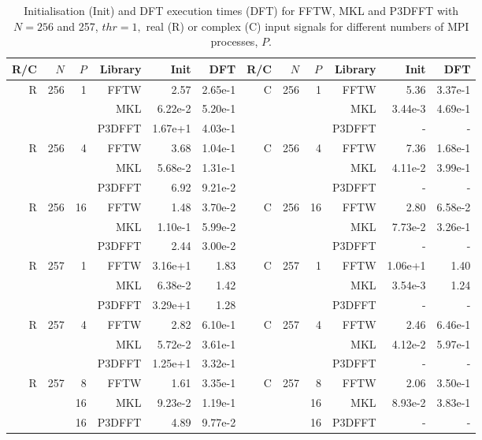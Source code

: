 \documentclass[a4paper]{article}
\begin{document}
\begin{table}[!htbp]
\begin{center}
\begin{tabular}{|r|r|r|r|r|r||r|r|r|r|r|r|}\hline
R/C & $N$ & $P$ & Library & Init & DFT & R/C & $N$ & $P$ & Library & Init & DFT\\ \hline
 R & 256 & 1 & FFTW &   2.57   &  2.65e-1  & C & 256 & 1 & FFTW &  5.36   &  3.37e-1  \\
  &  &  & MKL &   6.22e-2   &   5.20e-1  &   &  &  & MKL &   3.44e-3   &  4.69e-1   \\
  &  &  & P3DFFT &  1.67e+1   &   4.03e-1  &   &  &  & P3DFFT &  -   &  -  \\ \hline
 R & 256 & 4 & FFTW &   3.68    &   1.04e-1  &  C & 256 & 4 & FFTW &   7.36   &  1.68e-1  \\
  &  &  & MKL &  5.68e-2   &   1.31e-1  &  &  &  & MKL &   4.11e-2   &   3.99e-1  \\
  &  &  & P3DFFT &  6.92   &   9.21e-2 &  &  &  & P3DFFT &  -   &  -  \\ \hline
 R & 256 & 16 & FFTW &  1.48   &  3.70e-2  & C & 256 & 16 & FFTW &  2.80   &  6.58e-2  \\
  &  &  & MKL &   1.10e-1   &    5.99e-2 &  &  &  & MKL &   7.73e-2   &   3.26e-1  \\
  &  &  & P3DFFT &  2.44   &  3.00e-2  &  &  &  & P3DFFT &  -   &  -  \\ \hline\hline
 R & 257 & 1 & FFTW &  3.16e+1   &  1.83  & C & 257 & 1 & FFTW &   1.06e+1   &  1.40   \\
  &  &  & MKL &   6.38e-2   &   1.42  &  &  &  & MKL &   3.54e-3   &   1.24  \\
  &  &  & P3DFFT & 3.29e+1    &   1.28  &  &  &  & P3DFFT &  -   & -   \\ \hline
 R & 257 & 4 & FFTW &   2.82    &   6.10e-1  & C & 257 & 4 & FFTW &  2.46   &  6.46e-1  \\
  &  &  & MKL &   5.72e-2   &   3.61e-1  &  &  &  & MKL &  4.12e-2    &   5.97e-1  \\
  &  &  & P3DFFT &   1.25e+1   &  3.32e-1 &  &  &  & P3DFFT &  -   &  -  \\ \hline
 R & 257 & 8 & FFTW &  1.61   &  3.35e-1  & C & 257 & 8 & FFTW &  2.06   &   3.50e-1  \\
  &  & 16 & MKL &    9.23e-2  &  1.19e-1  &  &  & 16 & MKL &   8.93e-2   &  3.83e-1   \\
  &  & 16 & P3DFFT &   4.89   &   9.77e-2  &  &  & 16 & P3DFFT &  -   &  -  \\ \hline\hline
\end{tabular}
\caption{ Initialisation (Init) and DFT execution times (DFT) for FFTW, MKL and P3DFFT with $N=256$ and 257, $thr=1,$ real (R) or complex (C) input signals for different numbers of MPI processes, $P.$ }\label{Tbl3DCompP}
\end{center}
\end{table}
\end{document}

